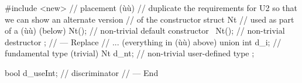 %
%
%
%
%
\begin{emcppshiddenlisting}[emcppsbatch=e4]
#include <new>  // placement (ù{}ù)
// duplicate the requirements for U2 so that we can show an alternate version
// of the constructor
struct Nt  // used as part of a (ù{}ù) (below)
{
    Nt();   // non-trivial default constructor
    ~Nt();  // non-trivial destructor
};
// --- Replace
// ... (everything in (ù{}ù) above)
    union
    {
        int  d_i;   // fundamental type (trivial)
        Nt   d_nt;  // non-trivial user-defined type
    };

    bool d_useInt;  // discriminator
// --- End
\end{emcppshiddenlisting}
